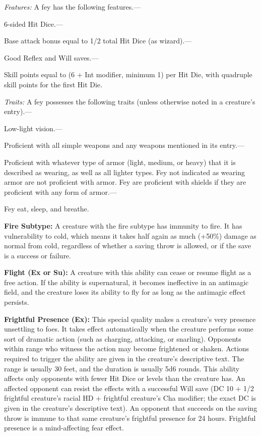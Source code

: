 \documentclass{article}
\begin{document}
\textit{Features: }A fey has the following features.---

6-sided Hit Dice.---

Base attack bonus equal to 1/2 total Hit Dice (as wizard).---

Good Reflex and Will saves.---

Skill points equal to (6 + Int modifier, minimum 1) per Hit Die, with quadruple 
skill points for the first Hit Die.

\textit{Traits: }A fey possesses the following traits (unless otherwise noted in 
a creature's entry).---

Low-light vision.---

Proficient with all simple weapons and any weapons mentioned in its entry.---

Proficient with whatever type of armor (light, medium, or heavy) that it is described 
as wearing, as well as all lighter types. Fey not indicated as wearing armor are 
not proficient with armor. Fey are proficient with shields if they are proficient 
with any form of armor.---

Fey eat, sleep, and breathe.

\vspace{12pt}
\textbf{Fire Subtype:} A creature with the fire subtype has immunity to fire. It 
has vulnerability to cold, which means it takes half again as much (+50\%) damage 
as normal from cold, regardless of whether a saving throw is allowed, or if the 
save is a success or failure.

\vspace{12pt}
\textbf{Flight (Ex or Su):} A creature with this ability can cease or resume flight 
as a free action. If the ability is supernatural, it becomes ineffective in an 
antimagic field, and the creature loses its ability to fly for as long as the antimagic 
effect persists.

\vspace{12pt}
\textbf{Frightful Presence (Ex):} This special quality makes a creature's very 
presence unsettling to foes. It takes effect automatically when the creature performs 
some sort of dramatic action (such as charging, attacking, or snarling). Opponents 
within range who witness the action may become frightened or shaken. Actions required 
to trigger the ability are given in the creature's descriptive text. The range 
is usually 30 feet, and the duration is usually 5d6 rounds. This ability affects 
only opponents with fewer Hit Dice or levels than the creature has. An affected 
opponent can resist the effects with a successful Will save (DC 10 + 1/2 frightful 
creature's racial HD + frightful creature's Cha modifier; the exact DC is given 
in the creature's descriptive text). An opponent that succeeds on the saving throw 
is immune to that same creature's frightful presence for 24 hours. Frightful presence 
is a mind-affecting fear effect. 
\end{document}
